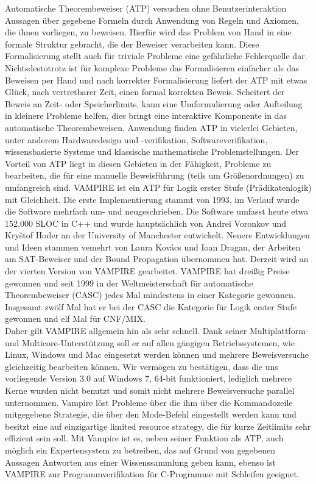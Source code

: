 \documentclass{article}
\begin{document}
Automatische Theorembeweiser (ATP) versuchen ohne Benutzerinteraktion Aussagen über gegebene Formeln durch Anwendung von Regeln und Axiomen, die ihnen vorliegen, zu beweisen.
Hierfür wird das Problem von Hand in eine formale Struktur gebracht, die der Beweiser verarbeiten kann.
Diese Formalisierung stellt auch für triviale Probleme eine gefährliche Fehlerquelle dar. 
Nichtsdestotrotz ist für komplexe Probleme das Formalisieren einfacher als das Beweisen per Hand und nach korrekter Formalisierung liefert der ATP mit etwas Glück, nach vertretbarer Zeit,
einen formal korrekten Beweis. Scheitert der Beweis an Zeit- oder Speicherlimits, kann eine
Umformulierung oder Aufteilung in kleinere Probleme helfen, dies bringt eine interaktive
Komponente in das automatische Theorembeweisen.
Anwendung finden ATP in vielerlei Gebieten, unter anderem Hardwaredesign und -verifikation, Softwareverifikation, wissensbasierte Systeme und klassische mathematische Problemstellungen.
Der Vorteil von ATP liegt in diesen Gebieten in der Fähigkeit, Probleme zu bearbeiten, 
die für eine manuelle Beweisführung (teils um Größenordnungen) zu umfangreich sind.
VAMPIRE ist ein ATP für Logik erster Stufe (Prädikatenlogik) mit Gleichheit. Die erste Implementierung stammt von 1993, im Verlauf wurde die Software mehrfach um- und neugeschrieben.
Die Software umfasst heute etwa 152,000 SLOC in C++ und wurde hauptsächlich von Andrei Voronkov und Kry{\v{s}}tof Hoder an der University of Manchester entwickelt.
Neuere Entwicklungen und Ideen stammen vemehrt von Laura Kov{\'a}cs und Ioan Dragan, der Arbeiten am SAT-Beweiser und der Bound Propagation übernommen hat.
Derzeit wird an der vierten Version von VAMPIRE gearbeitet.
VAMPIRE hat dreißig Preise gewonnen und seit 1999 in der Weltmeisterschaft für automatische Theorembeweiser (CASC) jedes Mal mindestens in einer Kategorie gewonnen.
Insgesamt zwölf Mal hat er bei der CASC die Kategorie für Logik erster Stufe gewonnen und elf Mal für CNF/MIX. ~\cite{vampirehp} \\ Daher gilt VAMPIRE allgemein hin als sehr schnell.
Dank seiner Multiplattform- und Multicore-Unterstützung soll er auf allen gängigen Betriebssystemen, wie Linux, Windows und Mac eingesetzt werden können und mehrere Beweisversuche gleichzeitig bearbeiten können.
Wir vermögen zu bestätigen, dass die uns vorliegende Version 3.0 auf Windows 7, 64-bit funktioniert, lediglich mehrere Kerne wurden nicht benutzt und somit nicht mehrere Beweisversuche parallel unternommen.
Vampire löst Probleme über die ihm über die Kommandozeile mitgegebene Strategie, die über den Mode-Befehl eingestellt werden kann und besitzt eine auf einzigartige limited resource strategy, die für kurze Zeitlimits sehr effizient sein soll. Mit Vampire ist es, neben seiner Funktion als ATP, auch möglich ein Expertensystem zu betreiben, das auf Grund von gegebenen Aussagen Antworten aus einer Wissenssammlung geben kann, ebenso ist VAMPIRE zur Programmverifikation für C-Programme mit Schleifen geeignet. 
\end{document}
